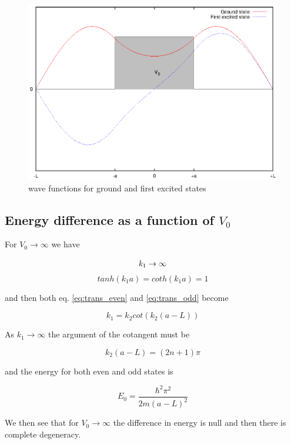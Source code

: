 \documentclass{article}
\begin{document}
\begin{figure}
\centering
\includegraphics{ex_1_3_psi.eps}
\caption{wave functions for ground and first excited states}
\label{ex_1_3_psi}
\end{figure}

\subsection{Energy difference as a function of \(V_0\)}
For \(V_0 \rightarrow \infty\) we have

\[
k_1 \rightarrow \infty \\
\]
\[
tanh(k_1a) = coth(k_1a) = 1
\]

and then both eq. \eqref{eq:trans_even} and \eqref{eq:trans_odd} become

\begin{equation}
k_1 = k_2 cot(k_2(a-L))
\end{equation}

As \(k_1 \rightarrow \infty\) the argument of the cotangent must be

\begin{equation}
k_2(a-L) = (2n+1)\pi
\end{equation}

and the energy for both even and odd states is

\begin{equation}
E_0 = \frac{\hbar^2 \pi^2}{2m(a-L)^2}
\end{equation}

We then see that for \( V_0 \rightarrow \infty \) the difference in energy is null and then there is complete degeneracy.
\end{document}
